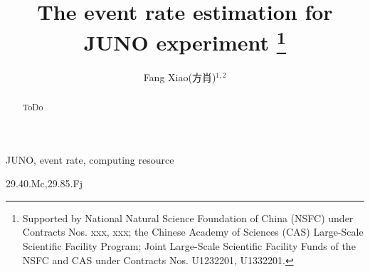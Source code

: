 \documentclass[a4paper,10pt,twoside]{paper_1}
\begin{document}
	 

	\title{The event rate estimation for JUNO experiment \thanks{Supported by National Natural Science Foundation of China (NSFC) under Contracts Nos. xxx, xxx; the Chinese Academy of Sciences (CAS) Large-Scale Scientific Facility Program; Joint Large-Scale Scientific Facility Funds of the NSFC and CAS under Contracts Nos.  U1232201, U1332201.} }


	\author{Fang Xiao(方肖)$^{1,2}$
	}
	\maketitle

	\address{
		$^1$ School of Physics, Sichuan University, Chengdu 610065 , China\\
		$^2$ Institute of High Energy Physics, Chinese Academy of Sciences, Beijing 100049, China\\
	}

	\begin{abstract}
		ToDo

	\end{abstract}


	\begin{keyword}
		JUNO,  event rate, computing resource
	\end{keyword}

	\begin{pacs}
		29.40.Mc,29.85.Fj
	\end{pacs}

\end{document}
